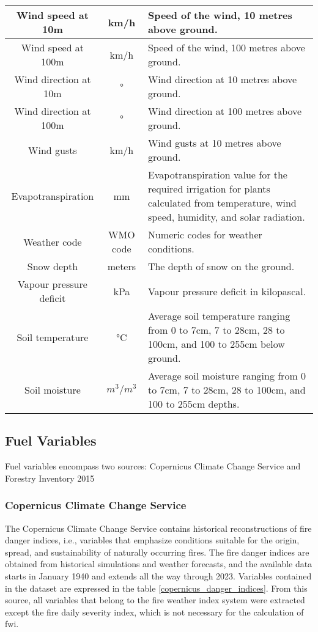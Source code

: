 \begin{table}[H]
\begin{tabular}{ccp{10cm}}
		\hline
		Wind speed at 10m & km/h & Speed of the wind, 10 metres above ground.  \\
		\hline
		Wind speed at 100m & km/h & Speed of the wind, 100 metres above ground.  \\
		\hline
		Wind direction at 10m & ° & Wind direction at 10 metres above ground.  \\
		\hline
		Wind direction at 100m & ° & Wind direction at 100 metres above ground.  \\
		\hline
		Wind gusts & km/h & Wind gusts at 10 metres above ground.  \\
		\hline
		Evapotranspiration & mm & Evapotranspiration value for the required irrigation for plants calculated from temperature, wind speed, humidity, and solar radiation. \\
		\hline
		Weather code & WMO code & Numeric codes for weather conditions.  \\
		\hline
		Snow depth & meters & The depth of snow on the ground.  \\
		\hline
		Vapour pressure deficit & kPa & Vapour pressure deficit in kilopascal.\\
		\hline
		Soil temperature & °C & Average soil temperature ranging from 0 to 7cm, 7 to 28cm, 28 to 100cm, and 100 to 255cm below ground.\\
		\hline
		Soil moisture & $m^3/m^3$ & Average soil moisture ranging from 0 to 7cm, 7 to 28cm, 28 to 100cm, and 100 to 255cm depths.\\
		\hline
	\end{tabular}
\end{table}







\subsection{Fuel Variables}
Fuel variables encompass two sources: Copernicus Climate Change Service \cite{CopernicusCDS2019} and Forestry Inventory 2015 \cite{uva2021forestry,https://doi.org/10.15468/dl.zwfmbt}

\subsubsection{Copernicus Climate Change Service \cite{CopernicusCDS2019}}

The Copernicus Climate Change Service contains historical reconstructions of fire danger indices, i.e., variables that emphasize conditions suitable for the origin, spread, and sustainability of naturally occurring fires. The fire danger indices are obtained from historical simulations and weather forecasts, and the available data starts in January 1940 and extends all the way through 2023. Variables contained in the dataset are expressed in the table \ref{copernicus_danger_indices}.
From this source, all variables that belong to the fire weather index system were extracted except the fire daily severity index, which is not necessary for the calculation of fwi.

